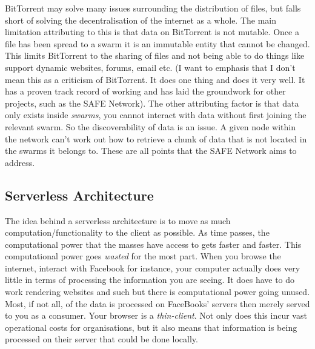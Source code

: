 \documentclass{l4proj}
\begin{document}
BitTorrent may solve many issues surrounding the distribution of files, but falls short of solving the decentralisation of the internet as a whole. The main limitation attributing to this is that data on BitTorrent is not mutable. Once a file has been spread to a swarm it is an immutable entity that cannot be changed. This limits BitTorrent to the sharing of files and not being able to do things like support dynamic websites, forums, email etc. (I want to emphasis that I don't mean this as a criticism of BitTorrent. It does one thing and does it very well. It has a proven track record of working and has laid the groundwork for other projects, such as the SAFE Network). The other attributing factor is that data only exists inside \textit{swarms}, you cannot interact with data without first joining the relevant swarm. So the discoverability of data is an issue. A given node within the network can't work out how to retrieve a chunk of data that is not located in the swarms it belongs to. These are all points that the SAFE Network aims to address.

\subsection{Serverless Architecture}

The idea behind a serverless architecture is to move as much computation/functionality to the client as possible. As time passes, the computational power that the masses have access to gets faster and faster. This computational power goes \textit{wasted} for the most part. When you browse the internet, interact with Facebook for instance, your computer actually does very little in terms of processing the information you are seeing. It does have to do work rendering websites and such but there is computational power going unused. Most, if not all, of the data is processed on FaceBooks' servers then merely served to you as a consumer. Your browser is a \textit{thin-client}. Not only does this incur vast operational costs for organisations, but it also means that information is being processed on their server that could be done locally.
\end{document}
